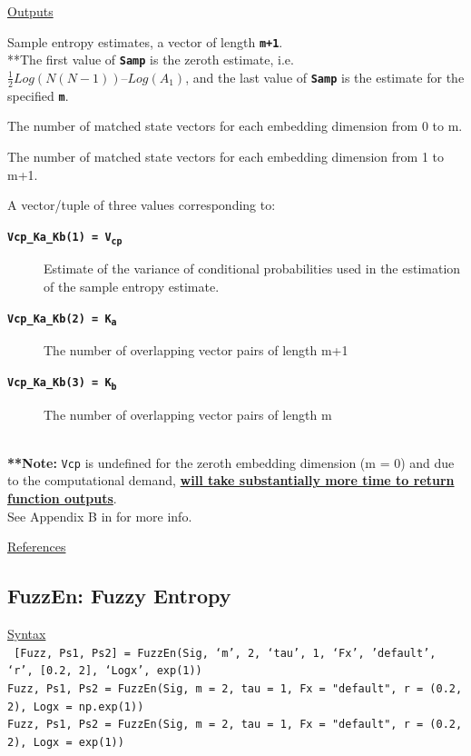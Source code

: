 \documentclass[12pt, a4paper, titlepage, openany]{book}
\begin{document}
\noindent \ul{Outputs}
\begin{description}[labelsep=1cm, labelwidth=2cm, nosep, style=multiline,leftmargin=3cm]\footnotesize
\item[\texttt{Samp}]		Sample entropy estimates, a vector of length \texttt{\textbf{m+1}}.\\
				**The first value of \texttt{\textbf{Samp}} is the zeroth estimate, i.e. $\frac{1}{2}Log(N(N-1)) – Log(A_1)$, and the last value of \texttt{\textbf{Samp}} is the estimate for the specified \textbf{\texttt{m}}.
\item[\texttt{A}]		The number of matched state vectors for each embedding dimension from 0 to m.
\item[\texttt{B}]		The number of matched state vectors for each embedding dimension from 1 to m+1.
\item[\texttt{Vcp\_Ka\_Kb}]		A vector/tuple of three values corresponding to:
\begin{description}
\item[\texttt{\textbf{Vcp\_Ka\_Kb(1) = V\textsubscript{cp}}}]  Estimate of the variance of conditional probabilities used in the estimation of the sample entropy estimate.
\item[\texttt{\textbf{Vcp\_Ka\_Kb(2) = \textbf{K\textsubscript{a}}}}]  The number of overlapping vector pairs of length m+1
\item[\texttt{\textbf{\textbf{Vcp\_Ka\_Kb(3) = K\textsubscript{b}}}}]  The number of overlapping vector pairs of length m
\end{description}
\ \\ \textbf{**Note:} \texttt{Vcp} is undefined for the zeroth embedding dimension (m = 0) 
 and due to the computational demand, \textbf{\underline{will take substantially more time to return function outputs}}.\\
 See Appendix B in \cite{Samp2} for more info.
\end{description}


\noindent \ul{References}\hspace{1cm}
\cite{Samp1} \cite{Samp2}



\newpage
\subsection{\normalsize FuzzEn: \hspace{15mm}  Fuzzy Entropy} \label{FuzzEn}
\noindent\ul{Syntax} \vspace{6mm} \\ \noindent \texttt{\footnotesize
[Fuzz, Ps1, Ps2] = FuzzEn(Sig, ‘m’, 2, ‘tau’, 1, ‘Fx’, 'default', ‘r’, [0.2, 2], ‘Logx’, exp(1))\\
Fuzz, Ps1, Ps2   = FuzzEn(Sig, m = 2, tau = 1, Fx = "default", r = (0.2, 2), Logx = np.exp(1))\\
Fuzz, Ps1, Ps2   = FuzzEn(Sig, m = 2, tau = 1, Fx = "default", r = (0.2, 2), Logx = exp(1))}
\end{document}
